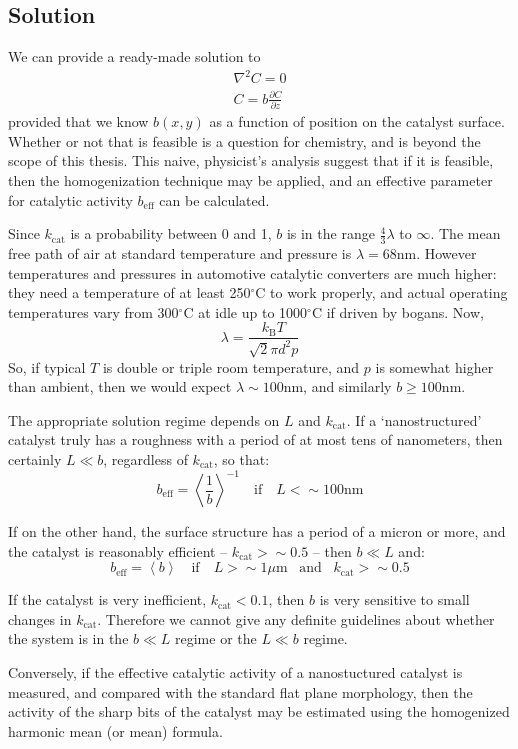 \documentclass[a4paper]{report}
\newcommand{\beff}{\ensuremath{b_{\mathrm{eff}}}}
\newcommand{\kcat}{\ensuremath{k_{\mathrm{cat}}}}
\begin{document}
\subsection*{Solution}
We can provide a ready-made solution to
\begin{gather}
\nabla^2 C = 0 \\
C = b \frac{\partial C}{\partial z}
\end{gather}
provided that we know $b(x,y)$ as a function of position on the catalyst surface. Whether or not that is feasible is a question for chemistry, and is beyond the scope of this thesis.  This naive, physicist's analysis suggest that if it is feasible, then the homogenization technique may be applied, and an effective parameter for catalytic activity $\beff$ can be calculated.

\vspace*{1em}
Since $\kcat$ is a probability between 0 and 1, $b$ is in the range $\frac{4}{3}\lambda$ to $\infty$. The mean free path of air at standard temperature and pressure is $\lambda = 68$nm.  However temperatures and pressures in automotive catalytic converters are much higher: they need a temperature of at least 250$^{\circ}$C to work properly, and actual operating temperatures vary from 300$^{\circ}$C at idle up to 1000$^{\circ}$C if driven by bogans. Now,
\begin{equation}
\lambda = \frac{k_{\mathrm{B}} T}{\sqrt{2} \pi d^2 p}
\end{equation}
So, if typical $T$ is double or triple room temperature, and $p$ is somewhat higher than ambient, then we would expect $\lambda \sim 100$nm, and similarly $b \geq 100$nm.

The appropriate solution regime depends on $L$ and $\kcat$.  If a `nanostructured' catalyst truly has a roughness with a period of at most tens of nanometers, then certainly $L \ll b$, regardless of $\kcat$, so that:
\begin{equation}
\beff = \left< \frac{1}{b} \right>^{-1} \quad \text{if} \quad L < \sim 100 \mathrm{nm}
\end{equation}

If on the other hand, the surface structure has a period of a micron or more, and the catalyst is reasonably efficient -- $\kcat > \sim 0.5$ -- then $b \ll L$ and:
\begin{equation}
\beff = \left< b \right> \quad \text{if} \quad L > \sim 1 \mu \mathrm{m} \;\;\; \text{and} \;\;\; \kcat > \sim 0.5
\end{equation}

If the catalyst is very inefficient, $\kcat < 0.1$, then $b$ is very sensitive to small changes in $\kcat$.  Therefore we cannot give any definite guidelines about whether the system is in the $b \ll L$ regime or the $L\ll b$ regime.

\vspace*{1em}
Conversely, if the effective catalytic activity of a nanostuctured catalyst is measured, and compared with the standard flat plane morphology, then the activity of the sharp bits of the catalyst may be estimated using the homogenized harmonic mean (or mean) formula.
\end{document}
